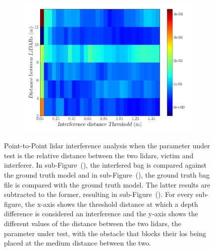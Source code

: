 \begin{figure}[!ht]
\begin{subfigure}[c]{0.45\textwidth}
	\label{fig:los:ground-truth-color-mesh}
\end{subfigure}
\\ \vspace{4mm}
\begin{subfigure}[c]{0.6\textwidth}
	\includegraphics[width=\textwidth]{img/lidar-interference/LOS/difference_ground_truth_interference_measurement.png}
\caption{}%
	\label{fig:los:difference-color-mesh}
\end{subfigure}

\caption[Point-to-Point analysis when the \acs{los} between the \acsp{lidar} is obstructed and their relative distance is  variated.]{Point-to-Point \ac{lidar} interference analysis when the parameter under test is the relative distance between the two \acp{lidar}, victim and interferer. In sub-Figure~(), the interfered bag is compared against the ground truth model and in sub-Figure~(), the ground truth bag file is compared with the ground truth model. The latter results are subtracted to the former, resulting in sub-Figure~(). For every sub-figure, the x-axis shows the threshold distance at which a depth difference is considered an interference and the y-axis shows the different values of the distance between the two \acp{lidar}, the parameter under test, with the obstacle that blocks their \ac{los} being placed at the medium distance between the two.}
\label{fig:los:color-mesh}
\end{figure}

